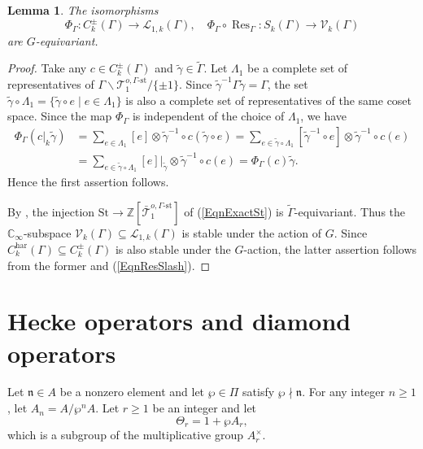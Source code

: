 \documentclass[11pt]{amsart}
\theoremstyle{plain}
\newtheorem{lem}[thm]{Lemma}
\theoremstyle{definition}
\newcommand{\har}{\mathrm{har}}
\DeclareMathOperator{\Res}{Res}
\newcommand{\st}{\mathrm{st}}
\newcommand{\St}{\mathrm{St}}
\newcommand{\cL}{\mathcal{L}}
\newcommand{\cT}{\mathcal{T}}
\newcommand{\cV}{\mathcal{V}}
\newcommand{\bZ}{\mathbb{Z}}
\newcommand{\frn}{\mathfrak{n}}
\newcommand{\Cinf}{\mathbb{C}_{\infty}}
\begin{document}
\begin{lem}\label{LemQuotAction}
	The isomorphisms 
	\[
	\Phi_{\Gamma}: C_k^{\pm}(\Gamma)\to \cL_{1,k}(\Gamma),\quad \Phi_{\Gamma}\circ \Res_{\Gamma}: S_k(\Gamma)\to \cV_k(\Gamma)
	\]
	are $G$-equivariant.
\end{lem}
\begin{proof}
	Take any $c\in  C_k^{\pm}(\Gamma)$ and $\tilde{\gamma}\in \tilde{\Gamma}$. Let $\Lambda_1$ be a
	complete set of representatives of $\Gamma\backslash \cT_1^{o,\Gamma\text{-}\st}/\{\pm 1\}$. Since $\tilde{\gamma}^{-1}\Gamma\tilde{\gamma}=\Gamma$, the set
	$\tilde{\gamma}\circ\Lambda_1=\{\tilde{\gamma}\circ e\mid e\in \Lambda_1\}$ is also a complete set of representatives of the same coset space. Since the map $
	\Phi_{\Gamma}$ is 
	independent of the choice of $\Lambda_1$, we have
	\[
	\begin{aligned}
		\Phi_{\Gamma}(c|_k\tilde{\gamma})&=\sum_{e\in \Lambda_1} [e]\otimes \tilde{\gamma}^{-1}\circ c(\tilde{\gamma}\circ e)=\sum_{e\in \tilde{\gamma}\circ 
		\Lambda_1}
		[\tilde{\gamma}^{-1}\circ e]\otimes 
		\tilde{\gamma}^{-1}\circ c(e)\\
		&=\sum_{e\in \tilde{\gamma}\circ \Lambda_1}[e]|_{\tilde{\gamma}}\otimes 
		\tilde{\gamma}^{-1}\circ c(e)=\Phi_{\Gamma}(c){\tilde{\gamma}}.
	\end{aligned}
	\]
	Hence the first assertion follows.
	
	By \cite[Remark 1.4]{BGP}, the injection $\St\to \bZ[\bar{\cT}_1^{o,\Gamma\text{-}\st}]$ of (\ref{EqnExactSt}) 
	is $
	\tilde{\Gamma}$-equivariant. Thus the $\Cinf$-subspace $\cV_k(\Gamma)\subseteq \cL_{1,k}(\Gamma)$ is stable under the action of $G$.
	Since $C_k^\har(\Gamma)\subseteq C_k^\pm(\Gamma)$ is also stable under the $G$-action,
	the latter assertion follows from the former and (\ref{EqnResSlash}). 
\end{proof}






\section{Hecke operators and diamond operators}\label{SecHecke}

Let $\frn\in A$ be a nonzero element and let $\wp\in \Pi$ satisfy $\wp\nmid \frn$. For any integer $n\geq 
1$, let $A_n=A/\wp^n A$. Let $r\geq 1$ be an integer and let 
\[
\Theta_r=1+\wp A_r,
\]
which is a subgroup of the multiplicative group $A_r^\times$. 
\end{document}
